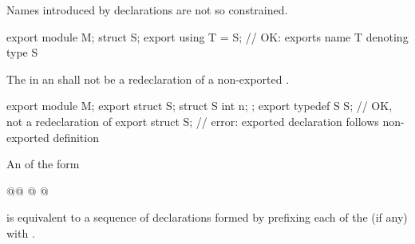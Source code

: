 \begin{std.txt}
  \enternote
  Names introduced by  declarations are not so constrained.
  \begin{example}
    \begin{codeblock}
      export module M;
      struct S;
      export using T = S;   // OK: exports name T denoting type S
    \end{codeblock}
  \end{example}
  \exitnote

  \begin{after}\color{addclr}
  \alinea
  The  in an 
  shall not be a redeclaration of
  a non-exported .
  \begin{example}
  \begin{codeblock}
  export module M;
  export struct S;
  struct S { int n; };
  export typedef S S;   // OK, not a redeclaration of 
  export struct S;      // error: exported declaration follows non-exported definition
  \end{codeblock}
  \end{example}
  \end{after}

  \alinea
  An  of the form
  \begin{grammar}
    @@ @\tcode{\{}  \tcode{\}}@ 
  \end{grammar}
  is equivalent to a sequence of declarations formed by prefixing each
   of the  (if any) with
  .


\end{std.txt}
